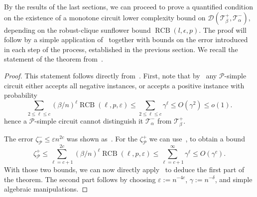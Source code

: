 \documentclass[10pt,a4paper]{article}
\newcommand{\RCB}{\mathop{RCB}}
\newcommand{\jnote}[1]{\todo[inline,backgroundcolor=blue!20!green]{#1 \\ \textsc{--Jarek}}}
\begin{document}
By the results of the last sections, we can proceed to prove a quantified condition on the existence of a monotone circuit lower complexity bound on $\mathcal{D}(\mathcal{T}^+_\beta, \mathcal{T}^-_\alpha)$, depending on the robust-clique sunflower bound $\RCB(l, \epsilon, p)$. The proof will follow by a simple application of~ together with bounds on the error introduced in each step of the process, established in the previous section. We recall the statement of the theorem from~.

\cliqueboundrcb*

\begin{proof}
This statement follows directly from~. First, note that by~ any $\mathcal{P}$-simple circuit either accepts all negative instances, or accepts a positive instance with probability 
\begin{equation*}
    \sum_{2\leq \ell \leq c} (\beta/n)^{\ell} \RCB(\ell, p, \varepsilon) \leq \sum_{2 \leq \ell \leq c} \gamma^\ell \leq O(\gamma^2) \leq o(1).
\end{equation*}
hence a $\mathcal{P}$-simple circuit cannot distinguish it $\mathcal{T}^-_{\alpha}$ from $\mathcal{T}^+_{\beta}$.

The error $\zeta_{\mathcal{P}}^- \leq \varepsilon n^{2c}$ was shown as~. For the $\zeta_{\mathcal{P}}^+$ we can use~, to obtain a bound
\begin{equation*}
    \zeta^+_{\mathcal{P}} \leq \sum_{\ell = c+1}^{2c} (\beta/n)^\ell \RCB(\ell, p, \varepsilon) \leq \sum_{\ell=c+1}^{\infty}\gamma^\ell \leq O(\gamma^{c}).
\end{equation*}
With those two bounds, we can now directly apply~ to deduce the first part of the theorem. The second part follows by choosing $\varepsilon := n^{-4c}$,  $\gamma := n^{-\delta}$, and simple algebraic manipulations.
\end{proof}
\end{document}
